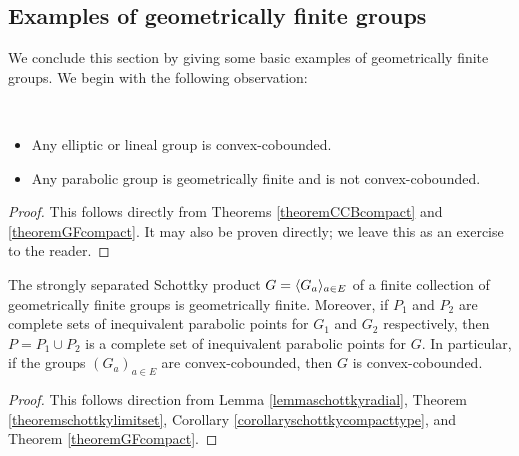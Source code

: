 \subsection{Examples of geometrically finite groups}

We conclude this section by giving some basic examples of geometrically finite groups. We begin with the following observation:

\begin{observation}~
\label{observationclassificationGF}
\begin{itemize}
\item[(i)] Any elliptic or lineal group is convex-cobounded.
\item[(ii)] Any parabolic group is geometrically finite and is not convex-cobounded.
\end{itemize}
\end{observation}
\begin{proof}
This follows directly from Theorems \ref{theoremCCBcompact} and \ref{theoremGFcompact}. It may also be proven directly; we leave this as an exercise to the reader.
\end{proof}



\begin{proposition}
\label{propositionSproductGF}
The strongly separated Schottky product $G = \langle G_a\rangle_{a\in E}$ of a finite collection of geometrically finite groups is geometrically finite. Moreover, if $P_1$ and $P_2$ are complete sets of inequivalent parabolic points for $G_1$ and $G_2$ respectively, then $P = P_1\cup P_2$ is a complete set of inequivalent parabolic points for $G$. In particular, if the groups $(G_a)_{a\in E}$ are convex-cobounded, then $G$ is convex-cobounded.
\end{proposition}
\begin{proof}
This follows direction from Lemma \ref{lemmaschottkyradial}, Theorem \ref{theoremschottkylimitset}, Corollary \ref{corollaryschottkycompacttype}, and Theorem \ref{theoremGFcompact}.
\end{proof}


